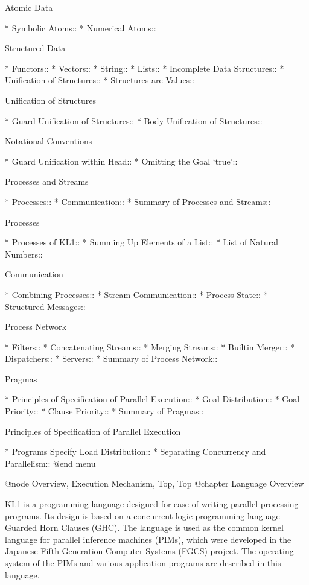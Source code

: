 Atomic Data

* Symbolic Atoms::              
* Numerical Atoms::             

Structured Data

* Functors::                    
* Vectors::                     
* String::                      
* Lists::                       
* Incomplete Data Structures::  
* Unification of Structures::   
* Structures are Values::       

Unification of Structures

* Guard Unification of Structures::  
* Body Unification of Structures::  

Notational Conventions

* Guard Unification within Head::  
* Omitting the Goal `true'::    

Processes and Streams

* Processes::                   
* Communication::               
* Summary of Processes and Streams::  

Processes

* Processes of KL1::            
* Summing Up Elements of a List::  
* List of Natural Numbers::     

Communication

* Combining Processes::         
* Stream Communication::        
* Process State::               
* Structured Messages::         

Process Network

* Filters::                     
* Concatenating Streams::       
* Merging Streams::             
* Builtin Merger::              
* Dispatchers::                 
* Servers::                     
* Summary of Process Network::  

Pragmas

* Principles of Specification of Parallel Execution::  
* Goal Distribution::           
* Goal Priority::               
* Clause Priority::             
* Summary of Pragmas::          

Principles of Specification of Parallel Execution

* Programs Specify Load Distribution::  
* Separating Concurrency and Parallelism::  
@end menu

@node Overview, Execution Mechanism, Top, Top
@chapter Language Overview

KL1 is a programming language designed for ease of writing parallel
processing programs.  Its design is based on a concurrent logic
programming language Guarded Horn Clauses (GHC).  The language is used
as the common kernel language for parallel inference machines (PIMs),
which were developed in the Japanese Fifth Generation Computer Systems
(FGCS) project.  The operating system of the PIMs and various
application programs are described in this language.

